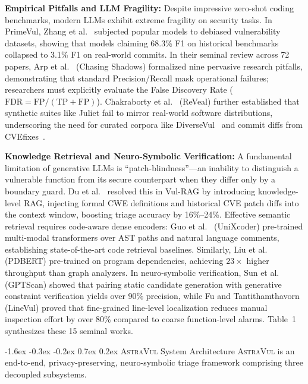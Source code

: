 \documentclass[10pt,twocolumn]{article}
\makeatletter
\renewcommand\section{\@startsection{section}{1}{\z@}%
  {-1.6ex \@plus -0.3ex \@minus -0.2ex}%
  {0.7ex \@plus 0.2ex}%
  {\normalfont\large\bfseries}}
\makeatother
\begin{document}
\vspace{1pt}\noindent\textbf{Empirical Pitfalls and LLM Fragility:}
Despite impressive zero-shot coding benchmarks, modern LLMs exhibit extreme fragility on security tasks. In PrimeVul, Zhang et al.~\cite{zhang2025howfar} subjected popular models to debiased vulnerability datasets, showing that models claiming 68.3\% F1 on historical benchmarks collapsed to 3.1\% F1 on real-world commits. In their seminal review across 72 papers, Arp et al.~\cite{arp2026chasingshadows} (Chasing Shadows) formalized nine pervasive research pitfalls, demonstrating that standard Precision/Recall mask operational failures; researchers must explicitly evaluate the False Discovery Rate ($\text{FDR} = \text{FP}/(\text{TP} + \text{FP})$). Chakraborty et al.~\cite{chakraborty2021reveal} (ReVeal) further established that synthetic suites like Juliet fail to mirror real-world software distributions, underscoring the need for curated corpora like DiverseVul~\cite{chen2023diversevul} and commit diffs from CVEfixes~\cite{bhandari2021cvefixes}.

\vspace{1pt}\noindent\textbf{Knowledge Retrieval and Neuro-Symbolic Verification:}
A fundamental limitation of generative LLMs is ``patch-blindness''—an inability to distinguish a vulnerable function from its secure counterpart when they differ only by a boundary guard. Du et al.~\cite{du2024vulrag} resolved this in Vul-RAG by introducing knowledge-level RAG, injecting formal CWE definitions and historical CVE patch diffs into the context window, boosting triage accuracy by 16\%--24\%. Effective semantic retrieval requires code-aware dense encoders: Guo et al.~\cite{guo2022unixcoder} (UniXcoder) pre-trained multi-modal transformers over AST paths and natural language comments, establishing state-of-the-art code retrieval baselines. Similarly, Liu et al.~\cite{liu2024pdbert} (PDBERT) pre-trained on program dependencies, achieving $23\times$ higher throughput than graph analyzers. In neuro-symbolic verification, Sun et al.~\cite{sun2024gptscan} (GPTScan) showed that pairing static candidate generation with generative constraint verification yields over 90\% precision, while Fu and Tantithamthavorn~\cite{fu2022linevul} (LineVul) proved that fine-grained line-level localization reduces manual inspection effort by over 80\% compared to coarse function-level alarms. Table~1 synthesizes these 15 seminal works.

\section{\textsc{AstraVul} System Architecture}
\textsc{AstraVul} is an end-to-end, privacy-preserving, neuro-symbolic triage framework comprising three decoupled subsystems.
\end{document}

